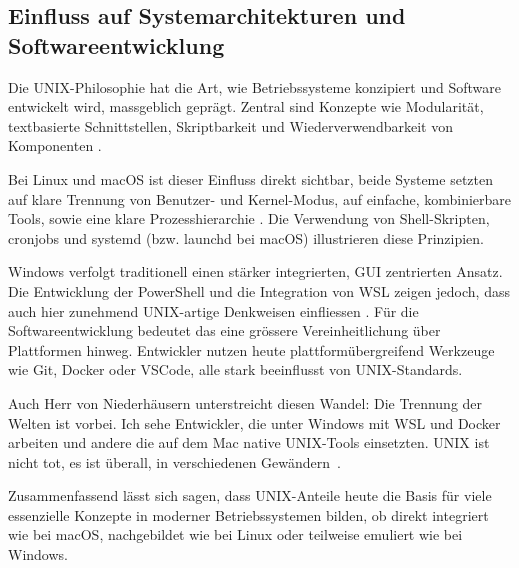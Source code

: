 \subsection{Einfluss auf Systemarchitekturen und Softwareentwicklung}

Die UNIX-Philosophie hat die Art, wie Betriebssysteme konzipiert und Software entwickelt wird, massgeblich geprägt. Zentral sind Konzepte wie Modularität,
textbasierte Schnittstellen, Skriptbarkeit und Wiederverwendbarkeit von Komponenten \cite{ArtOfUnixProgramming}.

Bei Linux und macOS ist dieser Einfluss direkt sichtbar, beide Systeme setzten auf klare Trennung von Benutzer- und Kernel-Modus, auf einfache, kombinierbare Tools,
sowie eine klare Prozesshierarchie \cite{ModernOS, FreeBSDOS}. Die Verwendung von Shell-Skripten, cronjobs und systemd (bzw. launchd bei macOS) illustrieren diese
Prinzipien.

Windows verfolgt traditionell einen stärker integrierten, GUI zentrierten Ansatz. Die Entwicklung der PowerShell und die Integration von WSL zeigen jedoch, dass
auch hier zunehmend UNIX-artige Denkweisen einfliessen \cite{WSL, OSConcept}. Für die Softwareentwicklung bedeutet das eine grössere Vereinheitlichung über
Plattformen hinweg. Entwickler nutzen heute plattformübergreifend Werkzeuge wie Git, Docker oder VSCode, alle stark beeinflusst von UNIX-Standards.

Auch Herr von Niederhäusern unterstreicht diesen Wandel: \glqq Die Trennung der Welten ist vorbei. Ich sehe Entwickler, die unter Windows mit WSL und Docker
arbeiten und andere die auf dem Mac native UNIX-Tools einsetzten. UNIX ist nicht tot, es ist überall, in verschiedenen Gewändern\grqq \ \cite{interviewNH}.

Zusammenfassend lässt sich sagen, dass UNIX-Anteile heute die Basis für viele essenzielle Konzepte in moderner Betriebssystemen bilden, ob direkt integriert wie bei
macOS, nachgebildet wie bei Linux oder teilweise emuliert wie bei Windows.